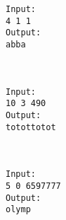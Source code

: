 \begin{verbatim}
Input:
4 1 1
Output:
abba



Input:
10 3 490
Output:
totottotot



Input:
5 0 6597777
Output:
olymp
\end{verbatim}